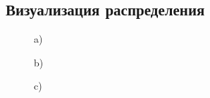 \documentclass[14pt,aspectratio=43]{beamer}
\begin{document}
\subsection{Визуализация распределения}\label{sub:smthrs}
\begin{frame}[<alignment>]

\begin{figure}[H]
\begin{minipage}[h]{0.47\linewidth}
 a) \\
\end{minipage}
\hfill
\begin{minipage}[h]{0.47\linewidth}
 b) \\
\end{minipage}
\vfill
\begin{minipage}[h]{0.47\linewidth}
 c) \\

\end{minipage}
\end{figure}
\end{frame}
\end{document}
